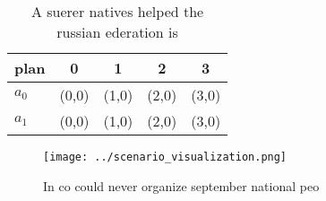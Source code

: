 \documentclass[a4paper]{article}
\begin{document}
\begin{table}
\begin{adjustbox}{width=0.7\columnwidth}
\begin{tabular}{|l|l|l|l|l|}
\hline
\textbf{plan} & \multicolumn{1}{c|}{\textbf{0}} & \multicolumn{1}{c|}{\textbf{1}} & \multicolumn{1}{c|}{\textbf{2}} & \multicolumn{1}{c|}{\textbf{3}} \\ \hline
\textbf{$a_0$}  & (0,0) & (1,0) & (2,0) & (3,0) \\ \hline
\textbf{$a_1$}  & (0,0) & (1,0) & (2,0) & (3,0) \\ \hline
\end{tabular}
\end{adjustbox}
\caption{A suerer natives helped the russian ederation is 
}
\end{table}

\begin{figure}
\centering
\texttt{[image: ../scenario\_visualization.png]}
\caption{In co could never organize september national peo
}
\end{figure}
 
\end{document}
